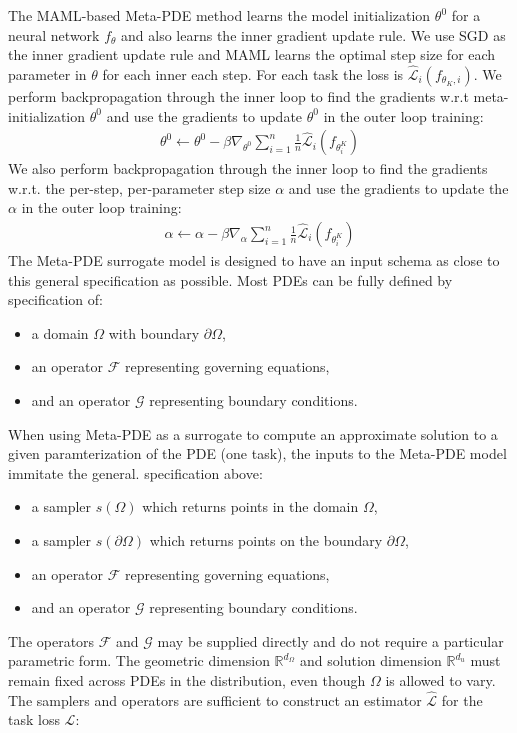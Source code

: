 The MAML-based Meta-PDE method learns the model initialization $\theta^0$ for a neural network $f_\theta$ and also learns the inner gradient update rule. We use SGD as the inner gradient update rule and MAML learns the optimal step size for each parameter in $\theta$ for each inner each step. For each task the loss is $\hat{\mathcal{L}}_i(f_{\theta_K, i})$. We perform backpropagation through the inner loop to find the gradients w.r.t meta-initialization $\theta^0$ and use the gradients to update $\theta^0$ in the outer loop training:
\begin{align}
    \theta^0 \leftarrow \theta^0 - \beta \nabla_{\theta^0} \sum_{i=1}^n  \frac{1}{n} \hat{\mathcal{L}}_i(f_{\theta^K _i})
\end{align}
We also perform backpropagation through the inner loop to find the gradients w.r.t. the per-step, per-parameter step size $\alpha$ and use the gradients to update the $\alpha$ in the outer loop training:
\begin{align}
    {\alpha}  \leftarrow {\alpha} - \beta  \nabla_{\alpha} \sum_{i=1}^n  \frac{1}{n} \hat{\mathcal{L}}_i(f_{\theta^K_i})
\end{align}
The Meta-PDE surrogate model is designed to have an input schema as close to this general specification as possible. Most PDEs can be fully defined by specification of:
\begin{itemize}
  \item a domain $\Omega$ with boundary $\partial \Omega$,
  \item an operator $\mathcal{F}$ representing governing equations,
  \item and an operator $\mathcal{G}$ representing boundary conditions.
\end{itemize}
When using Meta-PDE as a surrogate to compute an approximate solution to a given paramterization of the PDE (one task), the inputs to the Meta-PDE model immitate the general. specification above:
\begin{itemize}
  \item a sampler $s(\Omega)$ which returns points in the domain $\Omega$,
  \item a sampler $s(\partial\Omega)$ which returns points on the boundary $\partial\Omega$,
  \item an operator $\mathcal{F}$ representing governing equations,
  \item and an operator $\mathcal{G}$ representing boundary conditions.
\end{itemize}
The operators $\mathcal{F}$ and $\mathcal{G}$ may be supplied directly and do not require a particular parametric form. The geometric dimension $\mathbb{R}^{d_\Omega}$ and solution dimension $\mathbb{R}^{d_u}$ must remain fixed across PDEs in the distribution, even though $\Omega$ is allowed to vary. The samplers and operators are sufficient to construct an estimator $\hat{\mathcal{L}}$ for the task loss $\mathcal{L}$:
